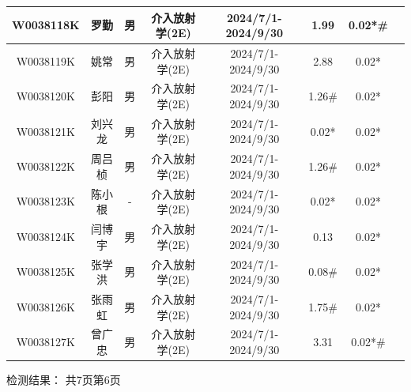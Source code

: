 \begin{table}[H]
\begin{tabular}{|c|c|c|c|c|c|c|c|}
\hline
W0038118K & 罗勤 & 男 & 介入放射学(2E) & 2024/7/1-2024/9/30 & 1.99 & 0.02*\# &  \\
\hline
W0038119K & 姚常 & 男 & 介入放射学(2E) & 2024/7/1-2024/9/30 & 2.88 & 0.02* &  \\
\hline
W0038120K & 彭阳 & 男 & 介入放射学(2E) & 2024/7/1-2024/9/30 & 1.26\# & 0.02* &  \\
\hline
W0038121K & 刘兴龙 & 男 & 介入放射学(2E) & 2024/7/1-2024/9/30 & 0.02* & 0.02* &  \\
\hline
W0038122K & 周吕桢 & 男 & 介入放射学(2E) & 2024/7/1-2024/9/30 & 1.26\# & 0.02* &  \\
\hline
W0038123K & 陈小根 & - & 介入放射学(2E) & 2024/7/1-2024/9/30 & 0.02* & 0.02* &  \\
\hline
W0038124K & 闫博宇 & 男 & 介入放射学(2E) & 2024/7/1-2024/9/30 & 0.13 & 0.02* &  \\
\hline
W0038125K & 张学洪 & 男 & 介入放射学(2E) & 2024/7/1-2024/9/30 & 0.08\# & 0.02* &  \\
\hline
W0038126K & 张雨虹 & 男 & 介入放射学(2E) & 2024/7/1-2024/9/30 & 1.75\# & 0.02* &  \\
\hline
W0038127K & 曾广忠 & 男 & 介入放射学(2E) & 2024/7/1-2024/9/30 & 3.31 & 0.02*\# &  \\
\hline
\end{tabular}
\end{table}


检测结果：
共7页第6页


